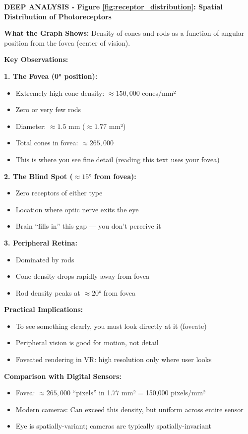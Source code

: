 \documentclass[12pt,a4paper]{article}
\begin{document}
\begin{deepexplanation}
\textbf{DEEP ANALYSIS - Figure \ref{fig:receptor_distribution}: Spatial Distribution of Photoreceptors}

\textbf{What the Graph Shows:}
Density of cones and rods as a function of angular position from the fovea (center of vision).

\textbf{Key Observations:}

\textbf{1. The Fovea (0° position):}
\begin{itemize}
    \item Extremely high cone density: $\approx 150,000$ cones/mm²
    \item Zero or very few rods
    \item Diameter: $\approx 1.5$ mm ($\approx 1.77$ mm²)
    \item Total cones in fovea: $\approx 265,000$
    \item This is where you see fine detail (reading this text uses your fovea)
\end{itemize}

\textbf{2. The Blind Spot ($\approx 15°$ from fovea):}
\begin{itemize}
    \item Zero receptors of either type
    \item Location where optic nerve exits the eye
    \item Brain ``fills in'' this gap --- you don't perceive it
\end{itemize}

\textbf{3. Peripheral Retina:}
\begin{itemize}
    \item Dominated by rods
    \item Cone density drops rapidly away from fovea
    \item Rod density peaks at $\approx 20°$ from fovea
\end{itemize}

\textbf{Practical Implications:}
\begin{itemize}
    \item To see something clearly, you must look directly at it (foveate)
    \item Peripheral vision is good for motion, not detail
    \item Foveated rendering in VR: high resolution only where user looks
\end{itemize}

\textbf{Comparison with Digital Sensors:}
\begin{itemize}
    \item Fovea: $\approx 265,000$ ``pixels'' in 1.77 mm² = 150,000 pixels/mm²
    \item Modern cameras: Can exceed this density, but uniform across entire sensor
    \item Eye is spatially-variant; cameras are typically spatially-invariant
\end{itemize}
\end{deepexplanation}
\end{document}
